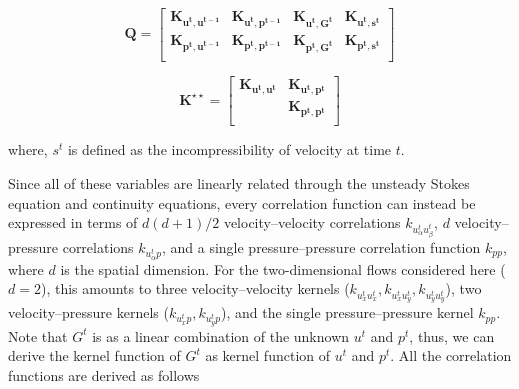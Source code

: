 \documentclass[11pt, a4paper]{report}
\begin{document}
\begin{equation}
    \boldsymbol{Q} = 
    \begin{bmatrix}
        \boldsymbol{K_{u^{t}, u^{t-1}}} &\boldsymbol{K_{u^{t}, p^{t-1}}}& \boldsymbol{K_{u^{t}, G^{t}}}& \boldsymbol{K_{u^{t}, s^t}} \\
        \boldsymbol{K_{p^{t}, u^{t-1}}} &\boldsymbol{K_{p^{t}, p^{t-1}}}& \boldsymbol{K_{p^{t}, G^{t}}}& \boldsymbol{K_{p^{t}, s^t}} \\
    \end{bmatrix}
    \label{eq:Q-generic}
\end{equation}

\begin{equation}
    \boldsymbol{K^{\star \star}} =
    \begin{bmatrix}
        \boldsymbol{K_{u^{t}, u^{t}}} &\boldsymbol{K_{u^{t}, p^{t}}} \\
        &\boldsymbol{K_{p^{t}, p^{t}}} \\
    \end{bmatrix}
\end{equation}

\noindent where, \(s^t\) is defined as the incompressibility of velocity at time \(t\).

Since all of these variables are linearly related through the unsteady Stokes equation and
continuity equations, every correlation function can instead be expressed in terms of \(d(d+1)/2\) velocity--velocity correlations \(k_{u^{t}_\alpha u^{t}_\beta}\), \(d\)
velocity--pressure correlations \(k_{u^{t}_\alpha p}\), and a single pressure--pressure
correlation function \(k_{pp}\), where \(d\) is the spatial dimension. For the two-dimensional flows considered here (\(d=2\)), this
amounts to three velocity--velocity kernels (\(k_{u^{t}_x u^{t}_x}, k_{u^{t}_x u^{t}_y}, k_{u^{t}_y u^{t}_y}\)),
two velocity--pressure kernels (\(k_{u^{t}_x p}, k_{u^{t}_y p}\)), and the single pressure--pressure
kernel \(k_{pp}\). Note that \({G^t}\) is as a linear combination of the unknown \(u^t\) and \(p^t\), thus, we can derive the kernel function of \({G^t}\) as
kernel function of \(u^t\) and \(p^t\). All the correlation functions are derived as follows
\end{document}
